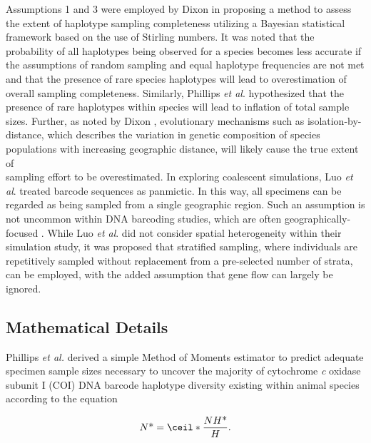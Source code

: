 Assumptions 1 and 3 were employed by Dixon \cite{dixon2006means} in proposing a method to assess the extent of haplotype sampling completeness utilizing a Bayesian statistical framework based on the use of Stirling numbers. It was noted that the probability of all haplotypes being observed for a species becomes less accurate if the assumptions of random sampling and equal haplotype frequencies are not met and that the presence of rare species haplotypes will lead to overestimation of overall sampling completeness. Similarly, Phillips \textit{et al}. \cite{phillips2015exploration} hypothesized that the presence of rare haplotypes within species will lead to inflation of total sample sizes. Further, as noted by Dixon \cite{dixon2006means}, evolutionary mechanisms such as isolation-by-distance, which describes the variation in genetic composition of species populations with increasing geographic distance, will likely cause the true extent of \\ sampling effort to be overestimated. In exploring coalescent simulations, Luo \textit{et al}. \cite{luo2015simulation} treated barcode sequences as panmictic. In this way, all specimens can be regarded as being sampled from a single geographic region. Such an assumption is not uncommon within DNA barcoding studies, which are often geographically-focused \cite{collins2013seven}. While Luo \textit{et al}. \cite{luo2015simulation} did not consider spatial heterogeneity within their simulation study, it was proposed that stratified sampling, where individuals are repetitively sampled without replacement from a pre-selected number of strata, can be employed, with the added assumption that gene flow can largely be ignored.



\subsection{Mathematical Details}

Phillips \textit{et al.} \cite{phillips2015exploration} derived a simple Method of Moments \cite{pearson1894contributions} estimator to predict adequate specimen sample sizes necessary to uncover the majority of cytochrome \textit{c} oxidase subunit I (COI) DNA barcode haplotype diversity existing within animal species according to the equation 

\begin{equation}
N\mbox{*} = \ceil*{\frac{NH\mbox{*}}{H}}.
\label{eqn}
\end{equation}



